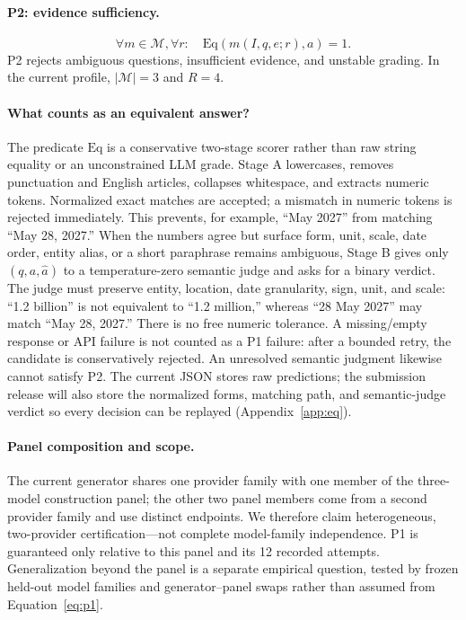 \documentclass{article}
\begin{document}
\paragraph{P2: evidence sufficiency.}
\begin{equation}
\forall m\in\mathcal{M},\forall r:\quad
\mathrm{Eq}(m(I,q,e;r),a)=1.
\label{eq:p2}
\end{equation}
P2 rejects ambiguous questions, insufficient evidence, and unstable grading.
In the current profile, $|\mathcal{M}|=3$ and $R=4$.

\paragraph{What counts as an equivalent answer?}
The predicate $\mathrm{Eq}$ is a conservative two-stage scorer rather than raw
string equality or an unconstrained LLM grade.
Stage A lowercases, removes punctuation and English articles, collapses
whitespace, and extracts numeric tokens.
Normalized exact matches are accepted; a mismatch in numeric tokens is
rejected immediately.
This prevents, for example, ``May 2027'' from matching ``May 28, 2027.''
When the numbers agree but surface form, unit, scale, date order, entity alias,
or a short paraphrase remains ambiguous, Stage B gives only $(q,a,\hat a)$ to
a temperature-zero semantic judge and asks for a binary verdict.
The judge must preserve entity, location, date granularity, sign, unit, and
scale: ``1.2 billion'' is not equivalent to ``1.2 million,'' whereas ``28 May
2027'' may match ``May 28, 2027.''
There is no free numeric tolerance.
A missing/empty response or API failure is not counted as a P1 failure: after
a bounded retry, the candidate is conservatively rejected.
An unresolved semantic judgment likewise cannot satisfy P2.
The current JSON stores raw predictions; the submission release will also
store the normalized forms, matching path, and semantic-judge verdict so every
decision can be replayed (Appendix~\ref{app:eq}).

\paragraph{Panel composition and scope.}
The current generator shares one provider family with one member of the
three-model construction panel; the other two panel members come from a second
provider family and use distinct endpoints.
We therefore claim heterogeneous, two-provider certification---not complete
model-family independence.
P1 is guaranteed only relative to this panel and its 12 recorded attempts.
Generalization beyond the panel is a separate empirical question, tested by
frozen held-out model families and generator--panel swaps rather than assumed
from Equation~\ref{eq:p1}.
\end{document}
